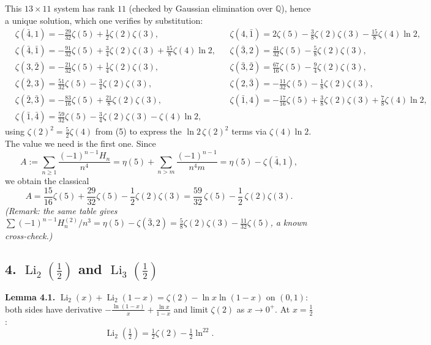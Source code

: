 \documentclass[11pt]{article}
\theoremstyle{remark}
\begin{document}
This $13\times11$ system has rank $11$ (checked by Gaussian elimination over $\mathbb{Q}$), hence a
unique solution, which one verifies by substitution:
\begin{equation}
\begin{aligned}
&\zeta(\bar4,1)=-\tfrac{29}{32}\zeta(5)+\tfrac12\zeta(2)\zeta(3), &
&\zeta(4,\bar1)=2\zeta(5)-\tfrac38\zeta(2)\zeta(3)-\tfrac{15}{8}\zeta(4)\ln2,\\
&\zeta(\bar4,\bar1)=-\tfrac{91}{32}\zeta(5)+\tfrac34\zeta(2)\zeta(3)+\tfrac{15}{8}\zeta(4)\ln2, &
&\zeta(\bar3,2)=\tfrac{41}{32}\zeta(5)-\tfrac58\zeta(2)\zeta(3),\\
&\zeta(3,\bar2)=-\tfrac{21}{32}\zeta(5)+\tfrac14\zeta(2)\zeta(3), &
&\zeta(\bar3,\bar2)=\tfrac{67}{16}\zeta(5)-\tfrac94\zeta(2)\zeta(3),\\
&\zeta(\bar2,3)=\tfrac{51}{32}\zeta(5)-\tfrac34\zeta(2)\zeta(3), &
&\zeta(2,\bar3)=-\tfrac{11}{32}\zeta(5)-\tfrac18\zeta(2)\zeta(3),\\
&\zeta(\bar2,\bar3)=-\tfrac{83}{16}\zeta(5)+\tfrac{21}{8}\zeta(2)\zeta(3), &
&\zeta(\bar1,4)=-\tfrac{17}{16}\zeta(5)+\tfrac38\zeta(2)\zeta(3)+\tfrac78\zeta(4)\ln2,\\
&\zeta(\bar1,\bar4)=\tfrac{59}{32}\zeta(5)-\tfrac34\zeta(2)\zeta(3)-\zeta(4)\ln2,&&
\end{aligned}\tag{10}
\end{equation}
using $\zeta(2)^2=\tfrac52\zeta(4)$ from (5) to express the $\ln2\,\zeta(2)^2$ terms via $\zeta(4)\ln2$.
The value we need is the first one. Since
\[
A:=\sum_{n\ge1}\frac{(-1)^{n-1}H_n}{n^4}
=\eta(5)+\sum_{n>m}\frac{(-1)^{n-1}}{n^4m}=\eta(5)-\zeta(\bar4,1),
\]
we obtain the classical
\begin{equation}
A=\frac{15}{16}\zeta(5)+\frac{29}{32}\zeta(5)-\frac12\zeta(2)\zeta(3)
=\frac{59}{32}\,\zeta(5)-\frac{1}{2}\,\zeta(2)\zeta(3). \tag{11}
\end{equation}
\textit{(Remark: the same table gives
$\sum(-1)^{n-1}H^{(2)}_n/n^3=\eta(5)-\zeta(\bar3,2)=\tfrac58\zeta(2)\zeta(3)-\tfrac{11}{32}\zeta(5)$,
a known cross-check.)}

\subsection*{4. $\operatorname{Li}_2(\tfrac12)$ and $\operatorname{Li}_3(\tfrac12)$}

\textbf{Lemma 4.1.} $\operatorname{Li}_2(x)+\operatorname{Li}_2(1-x)=\zeta(2)-\ln x\ln(1-x)$ on $(0,1)$:
both sides have derivative $-\frac{\ln(1-x)}{x}+\frac{\ln x}{1-x}$ and limit $\zeta(2)$ as
$x\to0^+$. At $x=\tfrac12$:
\begin{equation}
\operatorname{Li}_2(\tfrac12)=\tfrac12\zeta(2)-\tfrac12\ln^22. \tag{12}
\end{equation}
\end{document}
